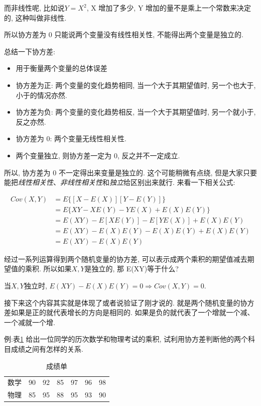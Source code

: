 而非线性呢, 比如说$Y=X^2$, X 增加了多少, Y 增加的量不是乘上一个常数来决定的, 这种叫做非线性. 

所以协方差为 0 只能说两个变量没有线性相关性, 不能得出两个变量是独立的. 

总结一下协方差:

\begin{itemize}
  \item 用于衡量两个变量的总体误差
  \item 协方差为正: 两个变量的变化趋势相同, 当一个大于其期望值时, 另一个也大于, 小于的情况亦然.
  \item 协方差为负: 两个变量的变化趋势相反, 当一个大于其期望值时, 另一个就小于, 反之亦然.
  \item 协方差为 0: 两个变量无线性相关性.
  \item 两个变量独立, 则协方差一定为 0, 反之并不一定成立.
\end{itemize}

所以, 协方差为 0 不一定得出来变量是独立的. 这个可能稍微有点绕, 但是大家只要能把\textit{线性相关性}、\textit{非线性相关性}和\textit{独立}给区别出来就行. 来看一下相关公式:

\begin{align*}
  Cov(X,Y) & = E\{[X-E(X)][Y-E(Y)]\} \\
  & = E\{XY - XE(Y) - YE(X) + E(X)E(Y)\} \\
  & = E(XY) - E[XE(Y)] - E[YE(X)] + E(X)E(Y) \\
  & = E(XY) - E(X)E(Y) - E(X)E(Y) + E(X)E(Y) \\
  & = E(XY) - E(X)E(Y)
\end{align*}

经过一系列运算得到两个随机变量的协方差, 可以表示成两个乘积的期望值减去期望值的乘积. 所以如果$X,Y$是独立的, 那 E(XY)等于什么?

当$X, Y$独立时, $E(XY) - E(X)E(Y) = 0 \Rightarrow Cov(X,Y) = 0 $.

接下来这个内容其实就是体现了或者说验证了刚才说的. 就是两个随机变量的协方差如果是正的就代表增长的方向是相同的. 如果是负的就代表了一个增就一个减、一个减就一个增. 

例:表\ref{fig:table5_2} 给出一位同学的历次数学和物理考试的乘积, 试利用协方差判断他的两个科目成绩之间有怎样的关系. 

\begin{table}[ht]
  \centering
  \begin{tabular}{lllllll}
    \midrule
      数学 & 90 & 92 & 85 & 97 & 96 & 98 \\
      物理 & 85 & 95 & 88 & 95 & 93 & 90 \\
    \bottomrule
  \end{tabular}
  \caption{成绩单}
  \label{fig:table5_2}
\end{table}

